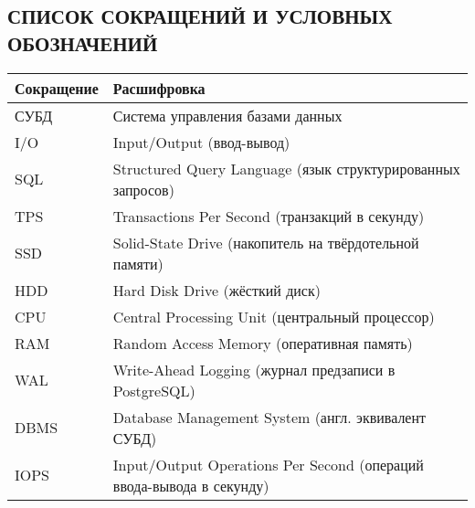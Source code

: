 \begin{center}
     \section*{СПИСОК СОКРАЩЕНИЙ И УСЛОВНЫХ ОБОЗНАЧЕНИЙ}
\end{center}

\begin{table}[h]
\centering
\begin{tabular}{|C{3cm}|L{9cm}|} %
\hline
\textbf{Сокращение} & \textbf{Расшифровка} \\ \hline
СУБД       & Система управления базами данных \\ \hline
I/O        & Input/Output (ввод-вывод) \\ \hline
SQL        & Structured Query Language (язык структурированных запросов) \\ \hline
TPS        & Transactions Per Second (транзакций в секунду) \\ \hline
SSD        & Solid-State Drive (накопитель на твёрдотельной памяти) \\ \hline
HDD        & Hard Disk Drive (жёсткий диск) \\ \hline
CPU        & Central Processing Unit (центральный процессор) \\ \hline
RAM        & Random Access Memory (оперативная память) \\ \hline
WAL        & Write-Ahead Logging (журнал предзаписи в PostgreSQL) \\ \hline
DBMS       & Database Management System (англ. эквивалент СУБД) \\ \hline
IOPS       & Input/Output Operations Per Second (операций ввода-вывода в секунду) \\ \hline
\end{tabular}
\end{table}

